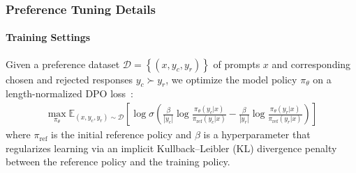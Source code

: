 \documentclass[table]{ai2style/ai2}
\begin{document}
{{\subsubsection{Preference Tuning Details}
\label{appx:dpo-details}
\paragraph{Training Settings} Given a preference dataset $\mathcal{D} = \left\{(x,y_c,y_r)\right\}$ of prompts $x$ and corresponding chosen and rejected responses $y_c \succ y_r$, we optimize the model policy $\pi_\theta$ on a length-normalized DPO loss~\citep{lambert2024tulu3}:
\begin{align*}
    \max_{\pi_\theta} \mathbb{E}_{(x,y_c,y_r)\sim\mathcal{D}}\left[ \log \sigma \left( \frac{\beta}{|y_c|}\log\frac{\pi_\theta(y_c | x)}{\pi_{\text{ref}}(y_c|x)} - \frac{\beta}{|y_r|}\log\frac{\pi_\theta(y_r | x)}{\pi_{\text{ref}}(y_r|x)}\right) \right]
\end{align*}
where $\pi_{\text{ref}}$ is the initial reference policy and $\beta$ is a hyperparameter that regularizes learning via an implicit Kullback–Leibler (KL) divergence penalty between the reference policy and the training policy.

}}
\end{document}
